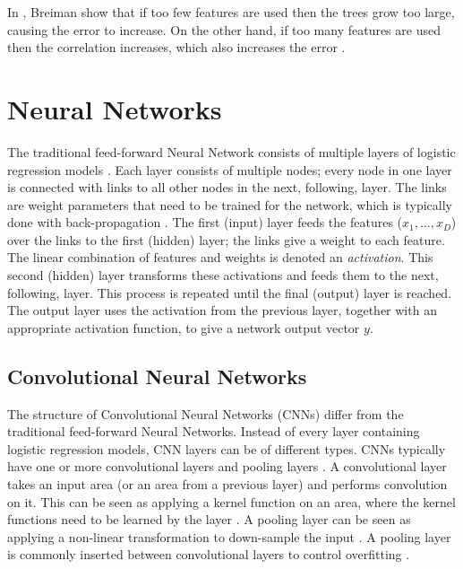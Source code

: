 In \cite{Breiman2001}, Breiman show that if too few features are used then the trees grow too large, causing the error to increase. 
On the other hand, if too many features are used then the correlation increases, which also increases the error \cite{Breiman2001}.

\section{Neural Networks}
\label{sec:nn}
The traditional feed-forward Neural Network consists of multiple layers of logistic regression models \cite{Bishop2006}.
Each layer consists of multiple nodes; every node in one layer is connected with links to all other nodes in the next, following, layer.
The links are weight parameters that need to be trained for the network, which is typically done with back-propagation \cite{Bishop2006}.
The first (input) layer feeds the features ($x_1, ..., x_D$) over the links to the first (hidden) layer; the links give a weight to each feature.
The linear combination of features and weights is denoted an \textit{activation}.
This second (hidden) layer transforms these activations and feeds them to the next, following, layer.
This process is repeated until the final (output) layer is reached.
The output layer uses the activation from the previous layer, together with an appropriate activation function, to give a network output vector $y$.

\subsection{Convolutional Neural Networks}
\label{sec:cnn}
The structure of Convolutional Neural Networks (CNNs) differ from the traditional feed-forward Neural Networks.
Instead of every layer containing logistic regression models, CNN layers can be of different types.
CNNs typically have one or more convolutional layers and pooling layers \cite{LeCun1995}.
A convolutional layer takes an input area (or an area from a previous layer) and performs convolution on it.
This can be seen as applying a kernel function on an area, where the kernel functions need to be learned by the layer \cite{Krizhevsky2012}.
A pooling layer can be seen as applying a non-linear transformation to down-sample the input \cite{LeCun1995}.
A pooling layer is commonly inserted between convolutional layers to control overfitting \cite{Krizhevsky2012}.


